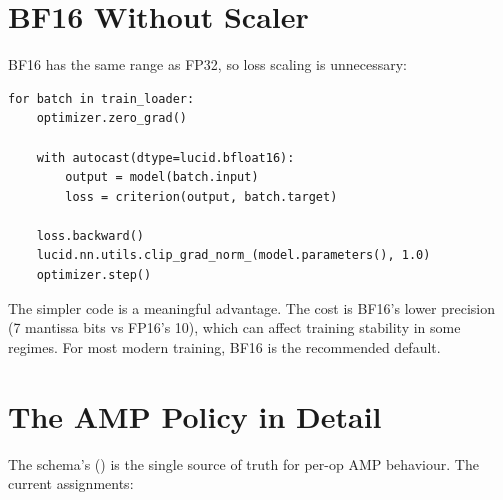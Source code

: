 \section{BF16 Without Scaler}
\label{sec:amp:bf16_no_scaler}

BF16 has the same range as FP32, so loss scaling is unnecessary:

\begin{lstlisting}[style=lucid,language=LucidPython]
for batch in train_loader:
    optimizer.zero_grad()

    with autocast(dtype=lucid.bfloat16):
        output = model(batch.input)
        loss = criterion(output, batch.target)

    loss.backward()
    lucid.nn.utils.clip_grad_norm_(model.parameters(), 1.0)
    optimizer.step()
\end{lstlisting}

The simpler code is a meaningful advantage. The cost is BF16's
lower precision (7 mantissa bits vs FP16's 10), which can affect
training stability in some regimes. For most modern training,
BF16 is the recommended default.

\section{The AMP Policy in Detail}
\label{sec:amp:policy_detail}

The schema's  () is the
single source of truth for per-op AMP behaviour. The current
assignments:

